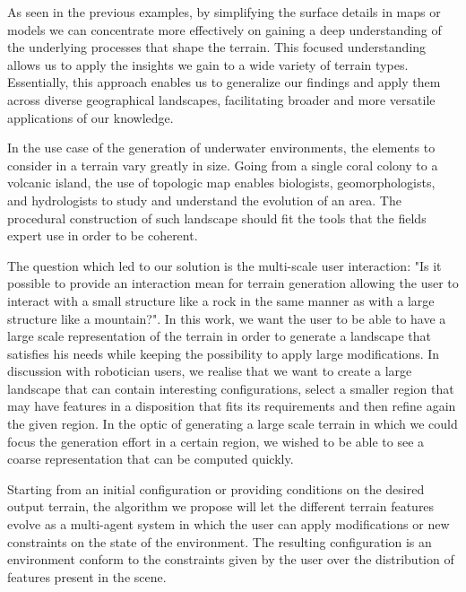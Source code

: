 As seen in the previous examples, by simplifying the surface details in maps or models we can concentrate more effectively on gaining a deep understanding of the underlying processes that shape the terrain. This focused understanding allows us to apply the insights we gain to a wide variety of terrain types. Essentially, this approach enables us to generalize our findings and apply them across diverse geographical landscapes, facilitating broader and more versatile applications of our knowledge.

In the use case of the generation of underwater environments, the elements to consider in a terrain vary greatly in size. Going from a single coral colony to a volcanic island, the use of topologic map enables biologists, geomorphologists, and hydrologists to study and understand the evolution of an area. The procedural construction of such landscape should fit the tools that the fields expert use in order to be coherent. 


The question which led to our solution is the multi-scale user interaction: "Is it possible to provide an interaction mean for terrain generation allowing the user to interact with a small structure like a rock in the same manner as with a large structure like a mountain?". 
In this work, we want the user to be able to have a large scale representation of the terrain in order to generate a landscape that satisfies his needs while keeping the possibility to apply large modifications.
In discussion with robotician users, we realise that we want to create a large landscape that can contain interesting configurations, select a smaller region that may have features in a disposition that fits its requirements and then refine again the given region.
In the optic of generating a large scale terrain in which we could focus the generation effort in a certain region, we wished to be able to see a coarse representation that can be computed quickly.

Starting from an initial configuration or providing conditions on the desired output terrain, the algorithm we propose will let the different terrain features evolve as a multi-agent system in which the user can apply modifications or new constraints on the state of the environment. The resulting configuration is an environment conform to the constraints given by the user over the distribution of features present in the scene.

